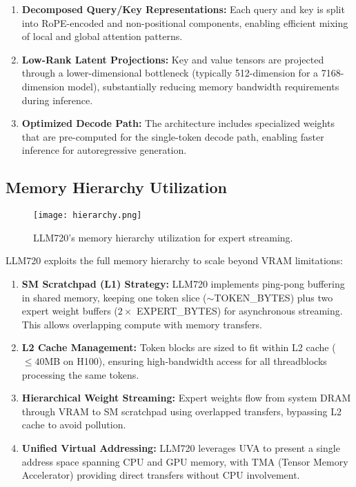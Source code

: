 \documentclass[11pt]{article}
\begin{document}
\begin{enumerate}
    \item \textbf{Decomposed Query/Key Representations:} Each query and key is split into RoPE-encoded and non-positional components, enabling efficient mixing of local and global attention patterns.
    
    \item \textbf{Low-Rank Latent Projections:} Key and value tensors are projected through a lower-dimensional bottleneck (typically 512-dimension for a 7168-dimension model), substantially reducing memory bandwidth requirements during inference.
    
    \item \textbf{Optimized Decode Path:} The architecture includes specialized weights that are pre-computed for the single-token decode path, enabling faster inference for autoregressive generation.
\end{enumerate}

\subsection{Memory Hierarchy Utilization}\label{subsec:memory}

\begin{figure}
    \centering
    \texttt{[image: hierarchy.png]}
    \caption{LLM720's memory hierarchy utilization for expert streaming.}
    \label{fig:memory-hierarchy}
\end{figure}


LLM720 exploits the full memory hierarchy to scale beyond VRAM limitations:

\begin{enumerate}
    \item \textbf{SM Scratchpad (L1) Strategy:} LLM720 implements ping-pong buffering in shared memory, keeping one token slice ($\sim$TOKEN\_BYTES) plus two expert weight buffers ($2 \times$ EXPERT\_BYTES) for asynchronous streaming. This allows overlapping compute with memory transfers.
    
    \item \textbf{L2 Cache Management:} Token blocks are sized to fit within L2 cache ($\leq 40$MB on H100), ensuring high-bandwidth access for all threadblocks processing the same tokens.
    
    \item \textbf{Hierarchical Weight Streaming:} Expert weights flow from system DRAM through VRAM to SM scratchpad using overlapped transfers, bypassing L2 cache to avoid pollution.
    
    \item \textbf{Unified Virtual Addressing:} LLM720 leverages UVA to present a single address space spanning CPU and GPU memory, with TMA (Tensor Memory Accelerator) providing direct transfers without CPU involvement.
\end{enumerate}
\end{document}
